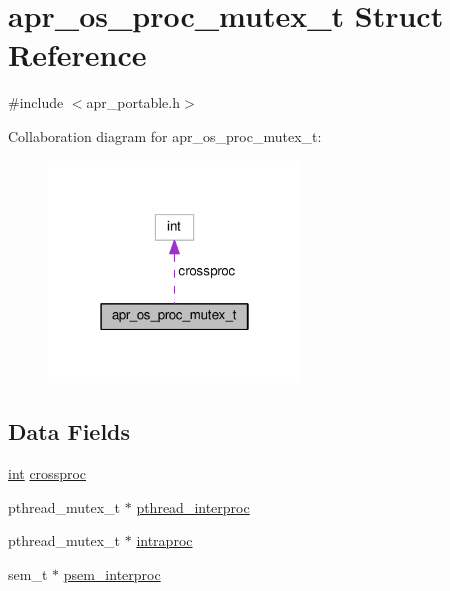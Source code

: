 \hypertarget{structapr__os__proc__mutex__t}{}\section{apr\+\_\+os\+\_\+proc\+\_\+mutex\+\_\+t Struct Reference}
\label{structapr__os__proc__mutex__t}


{\ttfamily \#include $<$apr\+\_\+portable.\+h$>$}



Collaboration diagram for apr\+\_\+os\+\_\+proc\+\_\+mutex\+\_\+t\+:
\nopagebreak
\begin{figure}[H]
\begin{center}
\leavevmode
\includegraphics[width=190pt]{structapr__os__proc__mutex__t__coll__graph}
\end{center}
\end{figure}
\subsection*{Data Fields}
\begin{DoxyCompactItemize}
\item 
\hyperlink{pcre_8txt_a42dfa4ff673c82d8efe7144098fbc198}{int} \hyperlink{structapr__os__proc__mutex__t_ab75e29a654ba0ff0dc491b625308fb79}{crossproc}
\item 
pthread\+\_\+mutex\+\_\+t $\ast$ \hyperlink{structapr__os__proc__mutex__t_aed588bef2efc836e5a768f32638e89c1}{pthread\+\_\+interproc}
\item 
pthread\+\_\+mutex\+\_\+t $\ast$ \hyperlink{structapr__os__proc__mutex__t_aa2e01fa37b652185a0dd3fae80caa4ad}{intraproc}
\item 
sem\+\_\+t $\ast$ \hyperlink{structapr__os__proc__mutex__t_ac109ebd758cb6aaa466a8e71cbeed56c}{psem\+\_\+interproc}
\end{DoxyCompactItemize}


